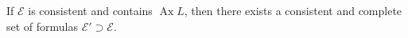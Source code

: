 If $\mathcal{E}$ is consistent and contains $\operatorname{Ax} L$, then there exists a consistent and complete set of formulas $\mathcal{E}' \supset \mathcal{E}$.
